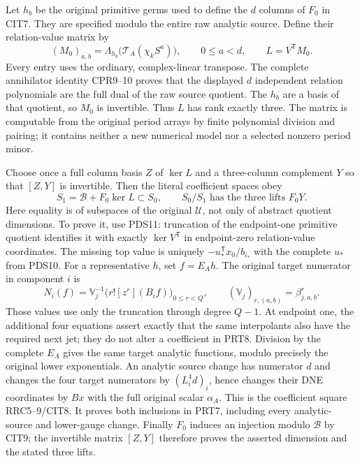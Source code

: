 Let $h_b$ be the original primitive germs used to define the $d$ columns
of $F_0$ in CIT7. They are specified modulo the entire raw analytic
source. Define their relation-value matrix by
\[
 (M_0)_{a,b}=\Lambda_{h_b}
                  \bigl(\mathcal T_A(\chi_k S^a)\bigr),
             \qquad0\le a<d,
 \qquad L=V^{\mathsf T}M_0.
 \tag{PRT6}
\]
Every entry uses the ordinary, complex-linear transpose. The complete
annihilator identity CPR9--10 proves that the displayed $d$ independent
relation polynomials are the full dual of the raw source quotient.
The $h_b$ are a basis of that quotient, so $M_0$ is invertible. Thus
$L$ has rank exactly three. The matrix is computable from the original
period arrays by finite polynomial division and pairing; it contains
neither a new numerical model nor a selected nonzero period minor.

Choose once a full column basis $Z$ of $\ker L$ and a three-column
complement $Y$ so that $[Z,Y]$ is invertible. Then the literal coefficient
spaces obey
\[
 \boxed{\quad S_1=\mathscr B+F_0\ker L\subset S_0,
       \qquad S_0/S_1\text{ has the three lifts }F_0Y.\quad}
 \tag{PRT7}
\]
Here equality is of subspaces of the original $\mathcal U$, not only
of abstract quotient dimensions. To prove it, use PDS11: truncation of
the endpoint-one primitive quotient identifies it with exactly
$\ker V^{\mathsf T}$ in endpoint-zero relation-value coordinates.
The missing top value is uniquely
$-u_*^{\mathsf T}x_0/b_{i_*}$ with the complete $u_*$ from PDS10.
For a representative $h$, set $f=E_Ah$. The original target numerator
in component $i$ is
\[
 N_i(f)=\mathbb V_j^{-1}
        \bigl(r![z^r](B_i f)\bigr)_{0\le r<Q},
 \qquad(\mathbb V_j)_{r,(a,b)}=\beta_{j,a,b}^{r}.
 \tag{PRT8}
\]
Those values use only the truncation through degree $Q-1$.
At endpoint one, the additional four equations assert exactly that
the same interpolants also have the required next jet; they do not
alter a coefficient in PRT8. Division by the complete $E_A$ gives
the same target analytic functions, modulo precisely the original lower
exponentials. An analytic source change has numerator $d$ and changes
the four target numerators by $(L_i^4d)_i$, hence changes their DNE
coordinates by $Bx$ with the full original scalar $\alpha_A$.
This is the coefficient square RRC5--9/CIT8. It proves both inclusions
in PRT7, including every analytic-source and lower-gauge change.
Finally $F_0$ induces an injection modulo $\mathscr B$ by CIT9;
the invertible matrix $[Z,Y]$ therefore proves the asserted dimension
and the stated three lifts.


